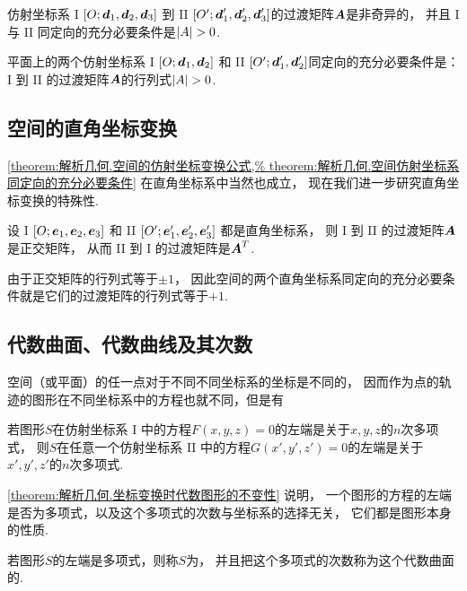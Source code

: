 \begin{theorem}\label{theorem:解析几何.空间仿射坐标系同定向的充分必要条件}
仿射坐标系 I \([O;\boldsymbol{d}_1,\boldsymbol{d}_2,\boldsymbol{d}_3]\)
到 II \([O';\boldsymbol{d}_1',\boldsymbol{d}_2',\boldsymbol{d}_3']\)的过渡矩阵\(\boldsymbol{A}\)是非奇异的，
并且 I 与 II 同定向的充分必要条件是\(\abs{A}>0\).
\end{theorem}

\begin{corollary}
平面上的两个仿射坐标系 I \([O;\boldsymbol{d}_1,\boldsymbol{d}_2]\)
和 II \([O';\boldsymbol{d}_1',\boldsymbol{d}_2']\)同定向的充分必要条件是：
I 到 II 的过渡矩阵\(\boldsymbol{A}\)的行列式\(\abs{A}>0\).
\end{corollary}

\subsection{空间的直角坐标变换}
\cref{theorem:解析几何.空间的仿射坐标变换公式,%
theorem:解析几何.空间仿射坐标系同定向的充分必要条件}
在直角坐标系中当然也成立，
现在我们进一步研究直角坐标变换的特殊性.

\begin{theorem}
设 I \([O;\boldsymbol{e}_1,\boldsymbol{e}_2,\boldsymbol{e}_3]\)
和 II \([O';\boldsymbol{e}_1',\boldsymbol{e}_2',\boldsymbol{e}_3']\)
都是直角坐标系，
则 I 到 II 的过渡矩阵\(\boldsymbol{A}\)是正交矩阵，
从而 II 到 I 的过渡矩阵是\(\boldsymbol{A}^T\).
\end{theorem}

由于正交矩阵的行列式等于\(\pm1\)，
因此空间的两个直角坐标系同定向的充分必要条件就是它们的过渡矩阵的行列式等于\(+1\).

\subsection{代数曲面、代数曲线及其次数}
空间（或平面）的任一点对于不同不同坐标系的坐标是不同的，
因而作为点的轨迹的图形在不同坐标系中的方程也就不同，但是有
\begin{theorem}\label{theorem:解析几何.坐标变换时代数图形的不变性}
若图形\(S\)在仿射坐标系 I 中的方程\(F(x,y,z)=0\)的左端是关于\(x,y,z\)的\(n\)次多项式，
则\(S\)在任意一个仿射坐标系 II 中的方程\(G(x',y',z')=0\)的左端是关于\(x',y',z'\)的\(n\)次多项式.
\end{theorem}
\cref{theorem:解析几何.坐标变换时代数图形的不变性} 说明，
一个图形的方程的左端是否为多项式，以及这个多项式的次数与坐标系的选择无关，
它们都是图形本身的性质.

若图形\(S\)的左端是多项式，则称\(S\)为，
并且把这个多项式的次数称为这个代数曲面的.

